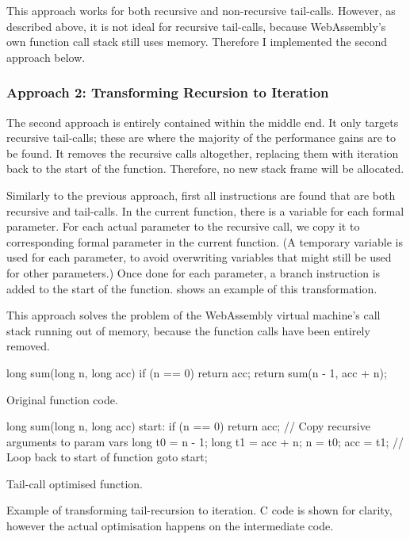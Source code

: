 \documentclass[00-main.tex]{subfiles}
\begin{document}
This approach works for both recursive and non-recursive tail-calls.
However, as described above, it is not ideal for recursive tail-calls, because WebAssembly's own function call stack still uses  memory.
Therefore I implemented the second approach below.

\subsubsection{Approach 2: Transforming Recursion to Iteration}

The second approach is entirely contained within the middle end.
It only targets recursive tail-calls; these are where the majority of the performance gains are to be found.
It removes the recursive calls altogether, replacing them with iteration back to the start of the function.
Therefore, no new stack frame will be allocated.

Similarly to the previous approach, first all  instructions are found that are both recursive and tail-calls.
In the current function, there is a variable for each formal parameter.
For each actual parameter to the recursive call, we copy it to corresponding formal parameter in the current function.
(A temporary variable is used for each parameter, to avoid overwriting variables that might still be used for other parameters.)
Once done for each parameter, a branch instruction is added to the start of the function.
 shows an example of this transformation.

This approach solves the problem of the WebAssembly virtual machine's call stack running out of memory, because the function calls have been entirely removed.

\begin{listing}[t]
  \begin{sublisting}[b]{0.49\textwidth}
    \begin{CListing}
      long sum(long n, long acc) {
          if (n == 0) {
              return acc;
          }
          return sum(n - 1, acc + n);
      }
    \end{CListing}
    \caption{Original function code.}
  \end{sublisting}
  \hfill
  \begin{sublisting}[b]{0.49\textwidth}
    \begin{CListing}
      long sum(long n, long acc) {
      start:
          if (n == 0) {
              return acc;
          }
          // Copy recursive arguments to param vars
          long t0 = n - 1;
          long t1 = acc + n;
          n = t0;
          acc = t1;
          // Loop back to start of function
          goto start;
      }
    \end{CListing}
    \caption{Tail-call optimised function.}
  \end{sublisting}
  \caption{Example of transforming tail-recursion to iteration. C code is shown for clarity, however the actual optimisation happens on the intermediate code.}
  \label{lst:tail-call optimisation example}
\end{listing}
\end{document}
